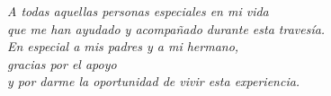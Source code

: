 \setcounter{page}{5}

\vspace*{8cm} 
\begin{flushright}
\large \textit{A todas aquellas personas especiales en mi vida\\que me han ayudado y acompañado durante esta travesía.\\En especial a mis padres y a mi hermano, \\ gracias por el apoyo \\ y por darme la oportunidad de vivir esta experiencia.
}
\end{flushright}

\newpage
